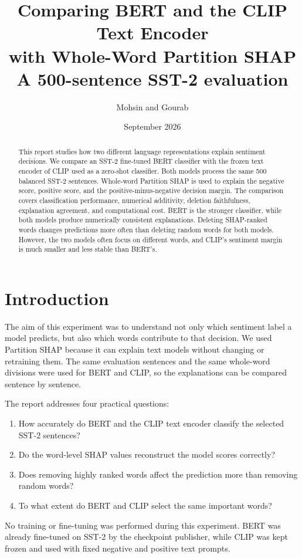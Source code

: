 \documentclass[11pt,a4paper]{article}
\title{\vspace{-1.2cm}\textbf{Comparing BERT and the CLIP Text Encoder\\with Whole-Word Partition SHAP}\\[0.5em]
\large A 500-sentence SST-2 evaluation}
\author{Mohsin and Gourab}
\date{September 2026}
\begin{document}
\maketitle

\begin{abstract}
This report studies how two different language representations explain sentiment decisions. We compare an SST-2 fine-tuned BERT classifier with the frozen text encoder of CLIP used as a zero-shot classifier. Both models process the same 500 balanced SST-2 sentences. Whole-word Partition SHAP is used to explain the negative score, positive score, and the positive-minus-negative decision margin. The comparison covers classification performance, numerical additivity, deletion faithfulness, explanation agreement, and computational cost. BERT is the stronger classifier, while both models produce numerically consistent explanations. Deleting SHAP-ranked words changes predictions more often than deleting random words for both models. However, the two models often focus on different words, and CLIP's sentiment margin is much smaller and less stable than BERT's.
\end{abstract}

\section{Introduction}

The aim of this experiment was to understand not only which sentiment label a model predicts, but also which words contribute to that decision. We used Partition SHAP because it can explain text models without changing or retraining them. The same evaluation sentences and the same whole-word divisions were used for BERT and CLIP, so the explanations can be compared sentence by sentence.

The report addresses four practical questions:
\begin{enumerate}
  \item How accurately do BERT and the CLIP text encoder classify the selected SST-2 sentences?
  \item Do the word-level SHAP values reconstruct the model scores correctly?
  \item Does removing highly ranked words affect the prediction more than removing random words?
  \item To what extent do BERT and CLIP select the same important words?
\end{enumerate}

No training or fine-tuning was performed during this experiment. BERT was already fine-tuned on SST-2 by the checkpoint publisher, while CLIP was kept frozen and used with fixed negative and positive text prompts.
\end{document}
